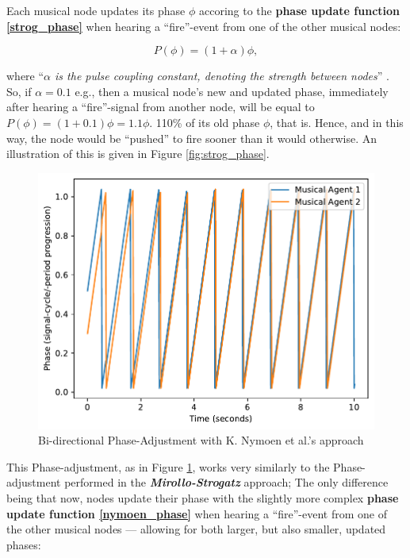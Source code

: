 			Each musical node updates its phase $\phi$ accoring to the \textbf{phase update function \eqref{strog_phase}} when hearing a ``fire''-event from one of the other musical nodes:
			
			\begin{equation}\label{strog_phase}
			P(\phi) = (1 + \alpha)\phi	,
			\end{equation}
			
			where ``\textit{$\alpha$ is the pulse coupling constant, denoting the strength between nodes}'' \cite{nymoen_synch}. So, if $\alpha = 0.1$ e.g., then a musical node's new and updated phase, immediately after hearing a ``fire''-signal from another node, will be equal to $P(\phi) = (1 + 0.1)\phi = 1.1\phi$. 110\% of its old phase $\phi$, that is. Hence, and in this way, the node would be ``pushed'' to fire sooner than it would otherwise. An illustration of this is given in Figure \ref{fig:strog_phase}.
			
			
			
			\begin{figure}[h]
				\centering
				\includegraphics[width=0.9\linewidth]{Assets/Figures/NymoenPhaseAdjustment.pdf}
				\caption{Bi-directional Phase-Adjustment with K. Nymoen et al.'s approach}
				\label{fig:nymoen_phase}
			\end{figure}
			
			This Phase-adjustment, as in Figure \ref{fig:nymoen_phase}, works very similarly to the Phase-adjustment performed in the \textbf{\textit{Mirollo-Strogatz}} approach; The only difference being that now, nodes update their phase with the slightly more complex \textbf{phase update function \eqref{nymoen_phase}} when hearing a ``fire''-event from one of the other musical nodes — allowing for both larger, but also smaller, updated phases:
			
